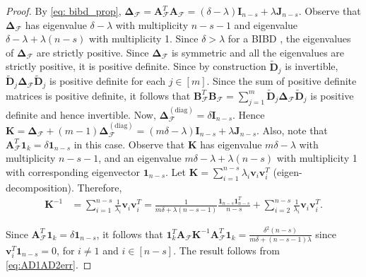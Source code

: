 \documentclass[journal,draftcls,onecolumn]{IEEEtran}
\theoremstyle{mystyle}
\newcommand{\bfD}{\mathbf{D}}
\newcommand{\cF}{\mathcal{F}}
\newcommand{\aditya}[1]{\marginpar{+}{\bf Aditya's remark}: {\em #1}}
\begin{document}
\begin{proof} 
By \eqref{eq: bibd_prop}, $\mathbf{\Delta}_{\mathcal{F}} = \mathbf{A}_{\mathcal{F}}^T\mathbf{A}_{\mathcal{F}} =  (\delta - \lambda) \mathbf{I}_{n-s} + \lambda \mathbf{J}_{n-s} $. Observe that $\mathbf{\Delta}_{\mathcal{F}}$ has eigenvalue $\delta - \lambda$ with multiplicity $n-s-1$ and eigenvalue $\delta - \lambda + \lambda(n-s)$ with multiplicity 1. Since $\delta  > \lambda$ for a BIBD \cite{StinsonBook}, the eigenvalues of $\mathbf{\Delta}_{\cF}$ are strictly positive. Since $\mathbf{\Delta}_{\mathcal{F}}$ is symmetric and all the eigenvalues are strictly positive, it is positive definite. Since by construction $\tilde{\bfD}_j$ is invertible, $\tilde{\bfD}_j \mathbf{\Delta}_{\cF} \tilde{\bfD}_j$ is positive definite for each $j \in [m]$.  Since the sum of positive definite matrices is positive definite,  it follows that $\mathbf{B}_{\mathcal{F}}^T\mathbf{B}_{\mathcal{F}}  =  \sum_{j = 1}^m \tilde{\bfD}_j\mathbf{\Delta}_{\mathcal{F}}\tilde{\bfD}_j$ is positive definite and hence invertible.
Now, $\mathbf{\Delta}^{(\text{diag})}_{\mathcal{F}} = \delta \mathbf{I}_{n-s}$. %
Hence $\mathbf{K} = \mathbf{\Delta}_{\mathcal{F}} + (m-1)\mathbf{\Delta}^{(\text{diag})}_{\mathcal{F}} = (m\delta - \lambda) \mathbf{I}_{n-s} + \lambda \mathbf{J}_{n-s} $. Also, note that $\mathbf{A}_{\mathcal{F}}^T\mathbf{1}_k = \delta \mathbf{1}_{n-s}$ in this case. Observe that $\mathbf{K}$ has eigenvalue $m\delta - \lambda$ with multiplicity $n-s-1$, and an eigenvalue $m\delta - \lambda + \lambda(n-s)$ with multiplicity 1 with corresponding eigenvector $\mathbf{1}_{n-s}$. %
Let $\mathbf{K} = \sum_{i = 1}^{n-s} \lambda_i \mathbf{v}_i\mathbf{v}_i^T$ (eigen-decomposition). Therefore,
\begin{align*}
\mathbf{K}^{-1} &= \sum_{i = 1}^{n-s}\frac{1}{\lambda_i}\mathbf{v}_i\mathbf{v}_i^T
= \frac{1}{m\delta + \lambda(n-s-1)} \frac{\mathbf{1}_{n-s}\mathbf{1}^T_{n-s}}{n-s} + \sum_{i = 2}^{n-s}\frac{1}{\lambda_i}\mathbf{v}_i\mathbf{v}_i^T.    
\end{align*}

Since $ \mathbf{A}_{\mathcal{F}}^T\mathbf{1}_k = \delta \mathbf{1}_{n-s}$, it follows that $\mathbf{1}_k^T \mathbf{A}_{\mathcal{F}} \mathbf{K}^{-1} \mathbf{A}_{\mathcal{F}}^T\mathbf{1}_k =  \frac{\delta^2(n-s)} {m\delta + (n-s-1)\lambda}$
since $\mathbf{v}_i^T \mathbf{1}_{n-s} = 0$, for $i \ne 1$ and $i \in [n-s]$. The result follows from \eqref{eq:AD1AD2err}.
\end{proof}
\end{document}
